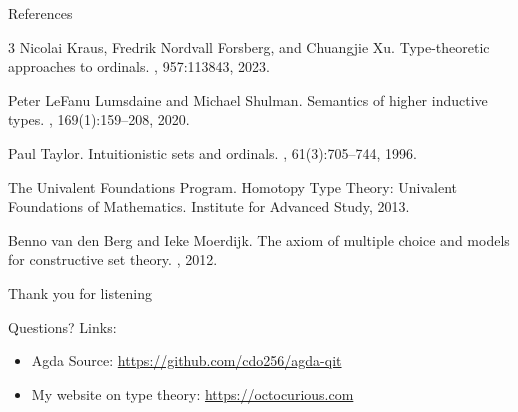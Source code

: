 \documentclass{beamer}
\begin{document}
\begin{frame}[allowframebreaks]{References}
\begin{thebibliography}{3}
  Nicolai Kraus, Fredrik Nordvall Forsberg, and Chuangjie Xu.
  \newblock Type-theoretic approaches to ordinals.
  , 957:113843, 2023.

  Peter LeFanu Lumsdaine and Michael Shulman.
  \newblock Semantics of higher inductive types.
  , 169(1):159--208, 2020.

  Paul Taylor.
  \newblock Intuitionistic sets and ordinals.
  , 61(3):705--744, 1996.

  The Univalent Foundations Program.
  \newblock Homotopy Type Theory: Univalent Foundations of Mathematics.
  \newblock Institute for Advanced Study, 2013.

  Benno van den Berg and Ieke Moerdijk.
  \newblock The axiom of multiple choice and models for constructive set theory.
  , 2012.

  \end{thebibliography}
\end{frame}

\begin{frame}
  \centering
  \vfill
  {\LARGE Thank you for listening}

  \vspace{1em}

  Questions?
  \vspace{1em}
  Links:
  \begin{itemize}
    \item Agda Source: \url{https://github.com/cdo256/agda-qit}
    \item My website on type theory: \url{https://octocurious.com}
  \end{itemize}
  \vfill
  \note{%
  }
\end{frame}
\end{document}
